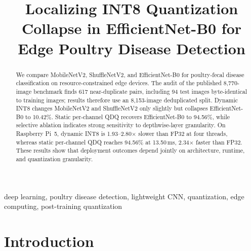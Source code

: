 \documentclass[conference,a4paper]{IEEEtran}
\begin{document}
\title{Localizing INT8 Quantization Collapse in EfficientNet-B0 for Edge Poultry Disease Detection}

\author{
\and
{}
\and
{}
}

\maketitle

\begin{abstract}
We compare MobileNetV2, ShuffleNetV2, and EfficientNet-B0 for poultry-fecal disease classification on resource-constrained edge devices. The audit of the published 8,770-image benchmark finds 617 near-duplicate pairs, including 94 test images byte-identical to training images; results therefore use an 8,153-image deduplicated split. Dynamic INT8 changes MobileNetV2 and ShuffleNetV2 only slightly but collapses EfficientNet-B0 to 10.42\%. Static per-channel QDQ recovers EfficientNet-B0 to 94.56\%, while selective ablation indicates strong sensitivity to depthwise-layer granularity. On Raspberry Pi~5, dynamic INT8 is 1.93--2.80$\times$ slower than FP32 at four threads, whereas static per-channel QDQ reaches 94.56\% at 13.50\,ms, 2.34$\times$ faster than FP32. These results show that deployment outcomes depend jointly on architecture, runtime, and quantization granularity.
\end{abstract}

\begin{IEEEkeywords}
deep learning, poultry disease detection, lightweight CNN, quantization, edge computing, post-training quantization
\end{IEEEkeywords}

\section{Introduction}
\end{document}
